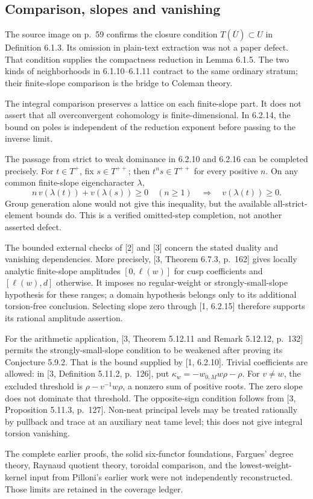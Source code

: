 \documentclass[10pt]{article}
\begin{document}
\subsection*{Comparison, slopes and vanishing}
The source image on p. 59 confirms the closure condition \(T(\overline U)\subset U\) in Definition 6.1.3. Its omission in plain-text extraction was not a paper defect. That condition supplies the compactness reduction in Lemma 6.1.5. The two kinds of neighborhoods in 6.1.10–6.1.11 contract to the same ordinary stratum; their finite-slope comparison is the bridge to Coleman theory.\par
The integral comparison preserves a lattice on each finite-slope part. It does not assert that all overconvergent cohomology is finite-dimensional. In 6.2.14, the bound on poles is independent of the reduction exponent before passing to the inverse limit.\par
The passage from strict to weak dominance in 6.2.10 and 6.2.16 can be completed precisely. For \(t\in T^+\), fix \(s\in T^{++}\); then \(t^ns\in T^{++}\) for every positive \(n\). On any common finite-slope eigencharacter \(\lambda\), \[n\,v(\lambda(t))+v(\lambda(s))\geq0\quad(n\geq1)
 \quad\Longrightarrow\quad v(\lambda(t))\geq0.\] Group generation alone would not give this inequality, but the available all-strict-element bounds do. This is a verified omitted-step completion, not another asserted defect.\par
The bounded external checks of [2] and [3] concern the stated duality and vanishing dependencies. More precisely, [3, Theorem 6.7.3, p. 162] gives locally analytic finite-slope amplitudes \([0,\ell(w)]\) for cusp coefficients and \([\ell(w),d]\) otherwise. It imposes no regular-weight or strongly-small-slope hypothesis for these ranges; a domain hypothesis belongs only to its additional torsion-free conclusion. Selecting slope zero through [1, 6.2.15] therefore supports its rational amplitude assertion.\par
For the arithmetic application, [3, Theorem 5.12.11 and Remark 5.12.12, p. 132] permits the strongly-small-slope condition to be weakened after proving its Conjecture 5.9.2. That is the bound supplied by [1, 6.2.10]. Trivial coefficients are allowed: in [3, Definition 5.11.2, p. 126], put \(\kappa_w=-w_{0,M}w\rho-\rho\). For \(v\ne w\), the excluded threshold is \(\rho-v^{-1}w\rho\), a nonzero sum of positive roots. The zero slope does not dominate that threshold. The opposite-sign condition follows from [3, Proposition 5.11.3, p. 127]. Non-neat principal levels may be treated rationally by pullback and trace at an auxiliary neat tame level; this does not give integral torsion vanishing.\par
The complete earlier proofs, the solid six-functor foundations, Fargues’ degree theory, Raynaud quotient theory, toroidal comparison, and the lowest-weight-kernel input from Pilloni’s earlier work were not independently reconstructed. Those limits are retained in the coverage ledger.\par
\end{document}
